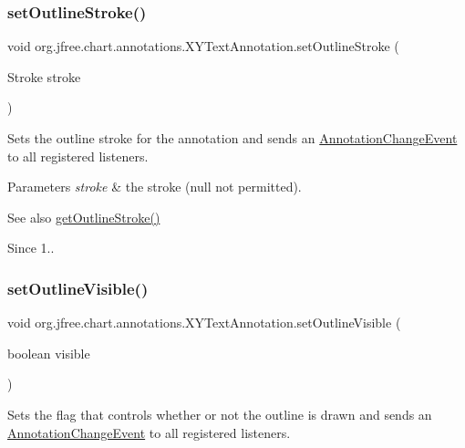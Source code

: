 \subsubsection{\texorpdfstring{set\+Outline\+Stroke()}{setOutlineStroke()}}
{\footnotesize\ttfamily void org.\+jfree.\+chart.\+annotations.\+X\+Y\+Text\+Annotation.\+set\+Outline\+Stroke (\begin{DoxyParamCaption}\item[{Stroke}]{stroke }\end{DoxyParamCaption})}

Sets the outline stroke for the annotation and sends an \mbox{\hyperlink{}{Annotation\+Change\+Event}} to all registered listeners.


\begin{DoxyParams}{Parameters}
{\em stroke} & the stroke ({\ttfamily null} not permitted).\\
\hline
\end{DoxyParams}
\begin{DoxySeeAlso}{See also}
\mbox{\hyperlink{classorg_1_1jfree_1_1chart_1_1annotations_1_1_x_y_text_annotation_a00d8dc7b42c84f629ffa430271a24e6b}{get\+Outline\+Stroke()}}
\end{DoxySeeAlso}
\begin{DoxySince}{Since}
1.. 
\end{DoxySince}
\mbox{\label{classorg_1_1jfree_1_1chart_1_1annotations_1_1_x_y_text_annotation_accc3373043060089da1ffc3b6a334b7e}} 
\subsubsection{\texorpdfstring{set\+Outline\+Visible()}{setOutlineVisible()}}
{\footnotesize\ttfamily void org.\+jfree.\+chart.\+annotations.\+X\+Y\+Text\+Annotation.\+set\+Outline\+Visible (\begin{DoxyParamCaption}\item[{boolean}]{visible }\end{DoxyParamCaption})}

Sets the flag that controls whether or not the outline is drawn and sends an \mbox{\hyperlink{}{Annotation\+Change\+Event}} to all registered listeners.


